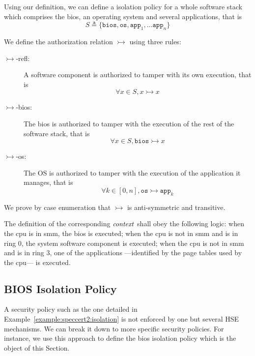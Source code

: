 \begin{example}
  \label{example:speccert2:isolation}
  Using our definition, we can define a isolation policy for a whole software
  stack which comprises the \ac{bios}, an operating system and several
  applications, that is
  \[
    S \triangleq \{ \mathtt{bios}, \mathtt{os}, \mathtt{app}_1, \dots
    \mathtt{app}_n \}
  \]

  We define the authorization relation $\rightarrowtail$ using three rules:
  \begin{description}
  \item [\(\rightarrowtail\)-refl:] A software component is authorized to tamper
    with its own execution, that is
    \[ \forall x \in S, x \rightarrowtail x \]
  \item [\(\rightarrowtail\)-bios:] The \ac{bios} is authorized to tamper with
    the execution of the rest of the software stack, that is
    \[ \forall x \in S, \mathtt{bios} \rightarrowtail x \]
  \item [\(\rightarrowtail\)-os:] The OS is authorized to tamper with the
    execution of the application it manages, that is
    \[ \forall k \in [0, n], \mathtt{os} \rightarrowtail \mathtt{app}_k \]
  \end{description}

  We prove by case enumeration that $\rightarrowtail$ is anti-symmetric and
  transitive.

  The definition of the corresponding $\mathit{context}$ shall obey the following
  logic: when the \ac{cpu} is in \ac{smm}, the \ac{bios} is executed; when the
  \ac{cpu} is not in \ac{smm} and is in ring 0, the system software component is
  executed; when the \ac{cpu} is not in \ac{smm} and is in ring 3, one of the
  applications ---identified by the page tables used by the \ac{cpu}--- is
  executed.
\end{example}

\subsection{BIOS Isolation Policy}
\label{subsec:speccert:biossec}


A security policy such as the one detailed in
Example~\ref{example:speccert2:isolation} is not enforced by one but several HSE
mechanisms.
%
We can break it down to more specific security policies.
%
For instance, we use this approach to define the \ac{bios} isolation policy
which is the object of this Section.

